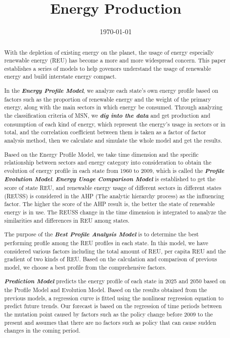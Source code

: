 \documentclass[a4paper,11pt]{article}
\title{Energy Production}%
\date{\today}
\begin{document}
\begin{abstract}


\par With the depletion of existing energy on the planet, the usage of energy especially renewable energy (REU) has become a more and more widespread concern. This paper establishes a series of models to help govenors understand the usage of renewable energy and build interstate energy compact.

\par In the \textbf{\emph{Energy Profile Model}}, we analyze each state's own energy profile based on factors such as the proportion of renewable energy and the weight of the primary energy, along with the main sectors in which energy be consumed. Through analyzing the classification criteria of MSN, we \textbf{\emph{dig into the data}} and get production and consumption of each kind of energy, which represent the energy's usage in sectors or in total, and the correlation coefficient between them is taken as a factor of factor analysis method, then we calculate and simulate the whole model and get the results.

\par Based on the Energy Profile Model, we take time dimension and the specific relationship between sectors and energy category into consideration to obtain the evolution of energy profile in each state from 1960 to 2009, which is called the \textbf{\emph{Profile Evolution Model}}. \textbf{\emph{Energy Usage Comparison Model}} is established to get the score of state REU, and renewable energy usage of different sectors in different states (REUSS) is considered in the AHP (The analytic hierarchy process) as the influencing factor. The higher the score of the AHP result is, the better the state of renewable energy is in use. The REUSS change in the time dimension is integrated to analyze the similarities and differences in REU among states.

\par The purpose of the \textbf{\emph{Best Profile Analysis Model}} is to determine the best performing profile among the REU profiles in each state. In this model, we have considered various factors including the total amount of REU, per capita REU and the gradient of two kinds of REU. Based on the calculation and comparison of previous model, we choose a best profile from the comprehensive factors.

\par \textbf{\emph{Prediction Model}} predicts the energy profile of each state in 2025 and 2050 based on the Profile Model and Evolution Model. Based on the results obtained from the previous models, a regression curve is fitted using the nonlinear regression equation to predict future trends. Our forecast is based on the regression of time periods between the mutation point caused by factors such as the policy change before 2009 to the present and assumes that there are no factors such as policy that can cause sudden changes in the coming period.


\end{abstract}
\end{document}
